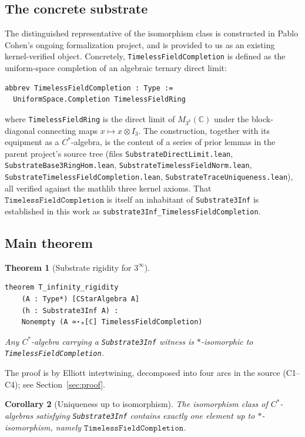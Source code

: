 \documentclass[11pt,a4paper]{article}
\theoremstyle{plain}
\newtheorem{theorem}{Theorem}[section]
\newtheorem{corollary}[theorem]{Corollary}
\theoremstyle{definition}
\begin{document}
\subsection{The concrete substrate}

The distinguished representative of the isomorphism class is constructed in Pablo Cohen's ongoing formalization project, and is provided to us as an existing kernel-verified object. Concretely, \texttt{TimelessFieldCompletion} is defined as the uniform-space completion of an algebraic ternary direct limit:

\begin{lstlisting}
abbrev TimelessFieldCompletion : Type :=
  UniformSpace.Completion TimelessFieldRing
\end{lstlisting}

\noindent
where \texttt{TimelessFieldRing} is the direct limit of $M_{3^k}(\mathbb{C})$ under the block-diagonal connecting maps $x \mapsto x \otimes I_3$. The construction, together with its equipment as a $C^{\ast}$-algebra, is the content of a series of prior lemmas in the parent project's source tree (files \texttt{SubstrateDirectLimit.lean}, \texttt{SubstrateBase3RingHom.lean}, \texttt{SubstrateTimelessFieldNorm.lean}, \texttt{SubstrateTimelessFieldCompletion.lean}, \texttt{SubstrateTraceUniqueness.lean}), all verified against the mathlib three kernel axioms. That $\texttt{TimelessFieldCompletion}$ is itself an inhabitant of \texttt{Substrate3Inf} is established in this work as \texttt{substrate3Inf\_TimelessFieldCompletion}.

\subsection{Main theorem}

\begin{theorem}[Substrate rigidity for $3^{\infty}$]
\label{thm:main}
\begin{lstlisting}
theorem T_infinity_rigidity
    (A : Type*) [CStarAlgebra A]
    (h : Substrate3Inf A) :
    Nonempty (A ≃⋆ₐ[ℂ] TimelessFieldCompletion)
\end{lstlisting}
\emph{Any $C^{\ast}$-algebra carrying a \texttt{Substrate3Inf} witness is $\ast$-isomorphic to \texttt{TimelessFieldCompletion}.}
\end{theorem}

The proof is by Elliott intertwining, decomposed into four arcs in the source (C1--C4); see Section~\ref{sec:proof}.

\begin{corollary}[Uniqueness up to isomorphism]
The isomorphism class of $C^{\ast}$-algebras satisfying \texttt{Substrate3Inf} contains exactly one element up to $\ast$-isomorphism, namely $\texttt{TimelessFieldCompletion}$.
\end{corollary}
\end{document}
